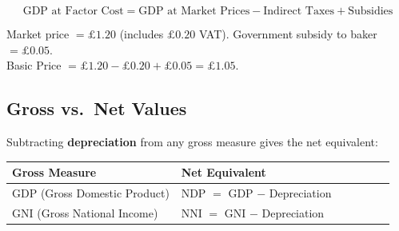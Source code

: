 \documentclass[11pt, a4paper, twoside]{book}
\begin{document}
\[
\text{GDP at Factor Cost} = \text{GDP at Market Prices} - \text{Indirect Taxes} + \text{Subsidies}
\]

\begin{example}
Market price $= \pounds1.20$ (includes $\pounds0.20$ VAT). Government subsidy to baker $= \pounds0.05$.\\
Basic Price $= \pounds1.20 - \pounds0.20 + \pounds0.05 = \pounds1.05$.
\end{example}

\subsection{Gross vs.\ Net Values}

Subtracting \textbf{depreciation} from any gross measure gives the net equivalent:

\begin{tcolorbox}[enhanced,colback=LightBlue,colframe=MidBlue!70,arc=0pt,boxrule=0.8pt]
\begin{tabular}{@{}>{\RaggedRight\arraybackslash}p{0.42\linewidth}>{\RaggedRight\arraybackslash}p{0.53\linewidth}@{}}
\textbf{\color{NavyPrimary}Gross Measure} & \textbf{\color{NavyPrimary}Net Equivalent} \\
\midrule
GDP (Gross Domestic Product) & NDP $=$ GDP $-$ Depreciation \\
GNI (Gross National Income) & NNI $=$ GNI $-$ Depreciation \\
\end{tabular}
\end{tcolorbox}
\end{document}
